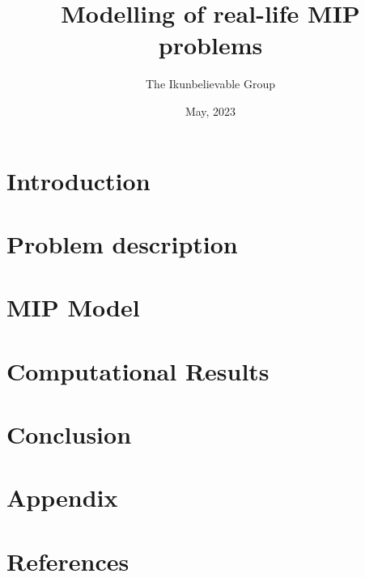 \documentclass[11pt]{article}
\title{Modelling of real-life MIP problems}
\author{The Ikunbelievable Group}
\date{May, 2023}
\begin{document}
\section{Introduction}
\section{Problem description}
\section{MIP Model}
\section{Computational Results}
\section{Conclusion}
\section{Appendix}
\section{References}
\end{document}
